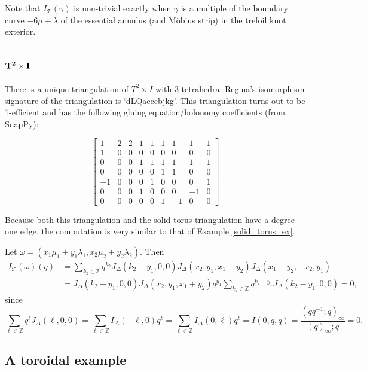 \documentclass[12pt,reqno]{amsart}  %
\theoremstyle{definition}
\theoremstyle{remark}
\newcommand{\CT}{\mathcal{T}}
\def\ID{I_{\Delta}}
\newcommand{\T}{\mathcal{T}}
\def\Z{\mathbb Z}
\def\JD{J_{\Delta}}
\begin{document}
Note that $I_\T(\gamma)$ is non-trivial exactly when $\gamma$ is a multiple of
the boundary curve $-6\mu+\lambda$ of the essential annulus 
(and M\"obius strip) in the trefoil knot exterior.

\subsection{$\bf{T^2 \times I}$}  
\label{t2xI_ex}

There is a unique triangulation of $T^2 \times I$ with 3 tetrahedra. 
Regina's isomorphism signature of the triangulation is `dLQacccbjkg'. This 
triangulation turns out to be 1-efficient and has the following 
gluing equation/holonomy coefficients (from SnapPy):

$$
\begin{bmatrix} 
1 &   2 &   2 &   1 &   1 &   1 &   1 &   1 &   1\\
1 &   0 &   0 &   0 &   0 &   0 &   0 &   0 &   0\\
 0 &   0 &   0 &   1 &   1 &   1 &   1 &   1 &   1\\
0 &   0 &   0 &   0 &   0 &   1 &   1 &   0 &   0\\
-1 &   0 &   0 &   0 &   1 &   0 &   0 &   0 &   1\\
0 &   0 &   0 &   1 &   0 &   0 &   0 &  -1 &   0\\
 0 &   0 &   0 &   0 &   0 &   1 &  -1 &   0 &   0
\end{bmatrix}
$$

Because both this triangulation and the solid torus triangulation have a 
degree one edge, the computation is very similar to that of 
Example \ref{solid_torus_ex}.

Let $\omega = (x_1 \mu_1+ y_1 \lambda_1, x_2 \mu_2+ y_2 \lambda_2)$. Then
\begin{align*}
I_{\CT}({\omega})(q) &= \sum_{k_2 \in \Z} 
q^{k_2} \JD(k_2-y_1,0,0) \JD(x_2, y_1,x_1+y_2) \JD(x_1-y_2,-x_2,y_1)\\
&=\JD(k_2-y_1,0,0) \JD(x_2, y_1,x_1+y_2) q^{y_1} 
\sum_{k_2 \in \Z} q^{k_2-y_1} \JD(k_2-y_1,0,0)=0,
\end{align*}
since
$$
\sum_{\ell\in\Z} q^\ell \JD(\ell,0,0) = 
\sum_{\ell\in\Z} \ID(-\ell,0) q^\ell= \sum_{\ell\in\Z} \ID(0,\ell) q^\ell
= I(0,q,q)= \frac{(q q^{-1};q)_\infty}{(q)_\infty;q}=0.
$$
 
\subsection{A toroidal example}  
\label{toroidal_ex}
\end{document}
